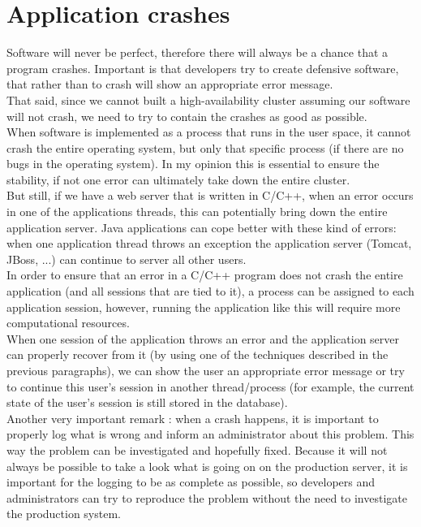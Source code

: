 \documentclass[12pt]{report}
\begin{document}
\section{Application crashes}
Software will never be perfect, therefore there will always be a
chance that a program crashes. Important is that developers try to
create defensive software, that rather than to crash will show an
appropriate error message.\\
That said, since we cannot built a high-availability cluster assuming
our software will not crash, we need to try to contain the crashes as
good as possible.\\
When software is implemented as a process that runs in the user space,
it cannot crash the entire operating system, but only that specific process (if
there are no bugs in the operating system). In my opinion this is
essential to ensure the stability, if not one error can ultimately
take down the entire cluster.\\
But still, if we have a web server that is written in C/C++, when an
error occurs in one of the applications threads, this can potentially
bring down the entire application server. Java applications can cope
better with these kind of errors: when one application thread throws
an exception the application server (Tomcat, JBoss, ...) can continue
to server all other users.\\ 
In order to ensure that an error in a  C/C++ program does not crash the entire
application (and all sessions that are tied to it),  a process can be
assigned to each application session, however, running the application
like this will require more computational resources.\\
When one session of the application throws an error and the
application server can properly recover from it (by using one of the
techniques described in the previous paragraphs), we can show the
user an appropriate error message or try to continue this user's
session in another thread/process (for example, the current state of
the user's session is still stored in the database).\\
Another very important remark : when a crash happens, it is important
to properly log what is wrong and inform an administrator about this
problem. This way the problem can be investigated and hopefully
fixed. 
Because it will not always be possible to take a look what is
going on on the production server, it is important for the logging to
be as complete as possible, so developers and administrators can try to
reproduce the problem without the need to investigate the production system.
\end{document}
